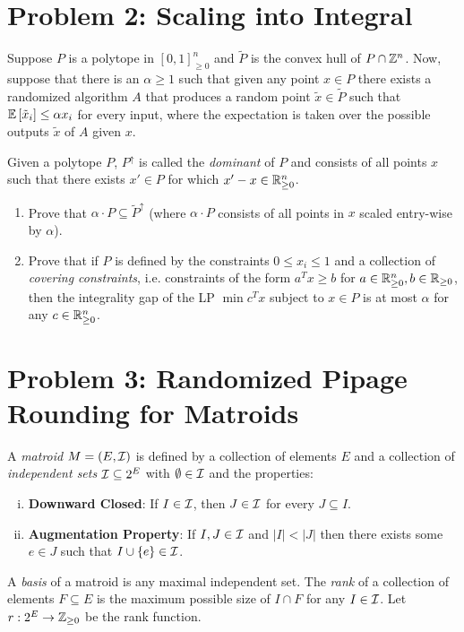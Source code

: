 \section{Problem 2: Scaling into Integral}

Suppose $P$ is a polytope in $[0,1]_{\ge 0}^n$ and $\tilde{P}$ is the convex hull of $P \cap \mathbb Z^n$. Now, suppose that there is an $\alpha \ge 1$ such that given any point $x \in P$ there exists a randomized algorithm $A$ that produces a random point $\tilde{x} \in \tilde{P}$ such that ${\mathbb{E}}\left[\tilde{x}_i\right] \le \alpha x_i$ for every input, where the expectation is taken over the possible outputs $\tilde{x}$ of $A$ given $x$. 

Given a polytope $P$, $P^\uparrow$ is called the \textit{dominant} of $P$ and consists of all points $x$ such that there exists $x' \in P$ for which $x'-x \in \mathbb R^n_{\ge 0}$.
\begin{enumerate}
	\item Prove that $\alpha \cdot P \subseteq \tilde{P}^\uparrow$ (where $\alpha \cdot P$ consists of all points in $x$ scaled entry-wise by $\alpha$).
	\item Prove that if $P$ is defined by the constraints $0 \le x_i \le 1$ and a collection of \textit{covering constraints}, i.e. constraints of the form $a^Tx \ge b$ for $a \in \mathbb R_{\ge 0}^n, b \in \mathbb R_{\ge 0}$, then the integrality gap of the LP $\min c^Tx$ subject to $x \in P$ is at most $\alpha$ for any $c \in \mathbb R^n_{\ge 0}$.
\end{enumerate}

\section{Problem 3: Randomized Pipage Rounding for Matroids}

A \textit{matroid} $M=(E,{\cal I})$ is defined by a collection of elements $E$ and a collection of \textit{independent sets} ${\cal I} \subseteq 2^E$ with $\emptyset \in {\cal I}$ and the properties:
\begin{enumerate}[(i)]
\item \textbf{Downward Closed}: If $I \in {\cal I}$, then $J \in {\cal I}$ for every $J \subseteq I$.
\item \textbf{Augmentation Property}: If $I,J \in {\cal I}$ and $|I| < |J|$ then there exists some $e \in J$ such that $I \cup \{e\} \in {\cal I}$. 
\end{enumerate}
A \textit{basis} of a matroid is any maximal independent set. The \textit{rank} of a collection of elements $F \subseteq E$ is the maximum possible size of $I \cap F$ for any $I \in {\cal I}$. Let $r: 2^E \to \mathbb Z_{\ge 0}$ be the rank function.

